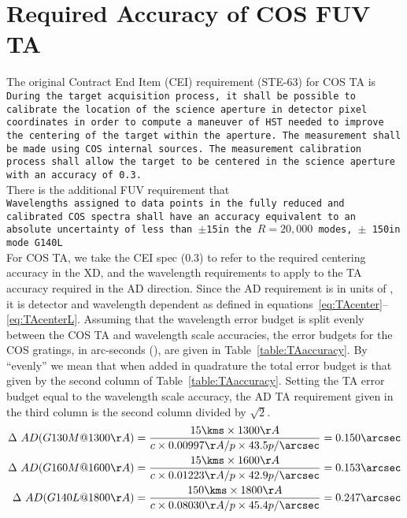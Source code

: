 \vspace{-0.4cm}
\section{Required Accuracy of COS FUV TA}\label{sec:accuracy}
\vspace{-0.3cm}
The original Contract End Item (CEI) requirement (STE-63) for COS TA is \\

\footnotesize
\noindent \texttt{During the target acquisition process, it shall be possible to calibrate the location of the science aperture in detector pixel
coordinates in order to compute a maneuver of HST needed to improve the centering of the target within the aperture.
The measurement shall be made using COS internal sources.
The measurement calibration process shall allow the target to be centered
in the science aperture with an accuracy of 0.3\arcsec.}\\

\normalsize
There is the additional FUV requirement that \\

\footnotesize
\noindent \texttt{Wavelengths assigned to data points in the fully reduced and calibrated COS spectra shall have an accuracy equivalent to an
absolute uncertainty of less than $\pm$15\kms in the $R=20,000$ modes, $\pm$ 150\kms in mode G140L}\\

\normalsize
For COS TA, we take the CEI spec (0.3\arcsec) to refer to the required centering accuracy in the XD, and the wavelength requirements to apply to
the TA accuracy required in the AD direction. Since the AD requirement is in units of \kmsno, it is detector and wavelength
dependent as defined in equations~\ref{eq:TAcenter}--\ref{eq:TAcenterL}.
Assuming that the wavelength error budget is split evenly between the COS TA and wavelength scale accuracies,
the error budgets for the COS gratings, in arc-seconds (\arcsec), are given in Table~\ref{table:TAaccuracy}. By ``evenly'' we mean that when added in quadrature the total error budget is that given by the second column of Table~\ref{table:TAaccuracy}. Setting the TA error budget equal to the wavelength scale accuracy, the AD TA requirement given in the third column is the second column divided by $\sqrt{2}$.
\small
\begin{eqnarray}\label{eq:TAcenter}
\Delta\ AD(G130M@1300\AA) = {{ 15\kms \times 1300\AA}\over{c \times 0.00997\AA/ p\times 43.5 p/\arcsec}} = 0.150\arcsec\\
\Delta\ AD(G160M@1600\AA) = {{ 15\kms \times 1600\AA}\over{c \times 0.01223\AA/ p\times 42.9 p/\arcsec}} = 0.153\arcsec\\
\Delta\ AD(G140L@1800\AA) = {{150\kms \times 1800\AA}\over{c \times 0.08030\AA/ p\times 45.4 p/\arcsec}} = 0.247\arcsec\label{eq:TAcenterL}
\end{eqnarray}
\normalsize
\clearpage

